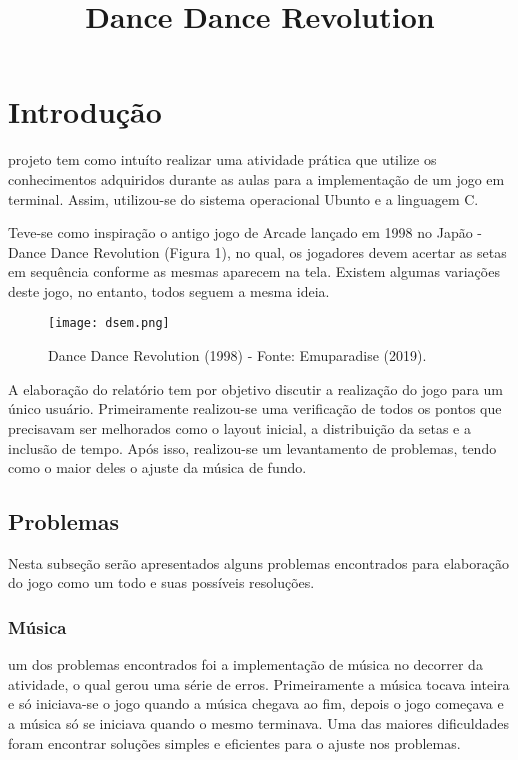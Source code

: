 \documentclass[journal]{IEEEtran}
\title {Dance Dance Revolution}
\author{\authorblockN{\prenomePrincipal\nomedomeioPrincipal\sobrenomePrincipal~\authorrefmark{Jéssica Santos Borges} e
\prenome2\sobrenome2\authorrefmark{Leticia Meurer} \membership
% 
\\\IEEEauthorblockA{\IEEEauthorrefmark{1}Universidade Federal de Santa Catarina (UFSC)}
% 
}}
\begin{document}
\maketitle
\IEEEdisplaynontitleabstractindextext
\IEEEpeerreviewmaketitle


\section{Introdução}

 projeto tem como intuíto realizar uma atividade prática que utilize os conhecimentos adquiridos durante as aulas para a implementação de um jogo em terminal. Assim,  utilizou-se do sistema operacional Ubunto e a linguagem C.

Teve-se como inspiração o antigo jogo de Arcade lançado em 1998 no Japão - Dance Dance Revolution (Figura 1), no qual, os jogadores devem acertar as setas em sequência conforme as mesmas aparecem na tela. Existem algumas variações deste jogo, no entanto, todos seguem a mesma ideia.

\begin{figure}[h]
    \centering
    \texttt{[image: dsem.png]}
    \caption{Dance Dance Revolution (1998) - Fonte: Emuparadise (2019).}
    \label{fig:dsem}
\end{figure}

A elaboração do relatório tem por objetivo discutir a realização do jogo para um único usuário. Primeiramente realizou-se uma verificação de todos os pontos que precisavam ser melhorados como o layout inicial, a distribuição da setas e a inclusão de tempo. Após isso, realizou-se um levantamento de problemas, tendo como o maior deles o ajuste da música de fundo.

\subsection{Problemas}
Nesta subseção serão apresentados alguns problemas encontrados para elaboração do jogo como um todo e suas possíveis resoluções.


\subsubsection{Música}
um dos problemas encontrados foi a implementação de música no decorrer da atividade, o qual gerou uma série de erros. Primeiramente a música tocava inteira e só iniciava-se o jogo quando a música chegava ao fim, depois o jogo começava e a música só se iniciava quando o mesmo terminava. Uma das maiores dificuldades foram encontrar soluções simples e eficientes para o ajuste nos problemas. 
 
\end{document}
